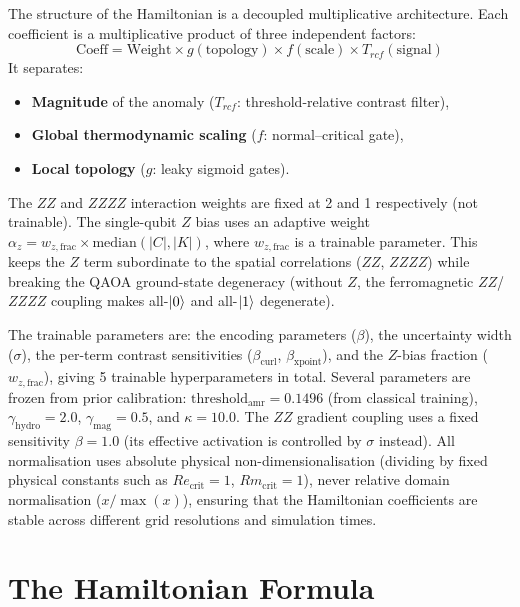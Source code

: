 \documentclass[12pt, a4paper, oneside]{report}
\begin{document}
The structure of the Hamiltonian is a decoupled multiplicative architecture. Each coefficient is a multiplicative product of three independent factors:
\begin{equation}
    \text{Coeff} = \text{Weight} \times g(\text{topology}) \times f(\text{scale}) \times T_{rcf}(\text{signal})
\end{equation}
It separates:
\begin{itemize}
    \item \textbf{Magnitude} of the anomaly ($T_{rcf}$: threshold-relative contrast filter),
    \item \textbf{Global thermodynamic scaling} ($f$: normal--critical gate),
    \item \textbf{Local topology} ($g$: leaky sigmoid gates).
\end{itemize}

The $ZZ$ and $ZZZZ$ interaction weights are fixed at 2 and 1 respectively (not trainable). The single-qubit $Z$ bias uses an adaptive weight $\alpha_z = w_{z,\text{frac}} \times \text{median}(|C|, |K|)$, where $w_{z,\text{frac}}$ is a trainable parameter. This keeps the $Z$ term subordinate to the spatial correlations ($ZZ$, $ZZZZ$) while breaking the QAOA ground-state degeneracy (without $Z$, the ferromagnetic $ZZ$/$ZZZZ$ coupling makes all-$\ket{0}$ and all-$\ket{1}$ degenerate).

The trainable parameters are: the encoding parameters ($\beta$), the uncertainty width ($\sigma$), the per-term contrast sensitivities ($\beta_{\text{curl}}$, $\beta_{\text{xpoint}}$), and the $Z$-bias fraction ($w_{z,\text{frac}}$), giving 5 trainable hyperparameters in total. Several parameters are frozen from prior calibration: $\text{threshold}_{\text{amr}} = 0.1496$ (from classical training), $\gamma_{\text{hydro}} = 2.0$, $\gamma_{\text{mag}} = 0.5$, and $\kappa = 10.0$. The $ZZ$ gradient coupling uses a fixed sensitivity $\beta = 1.0$ (its effective activation is controlled by $\sigma$ instead). All normalisation uses absolute physical non-dimensionalisation (dividing by fixed physical constants such as $Re_{\text{crit}} = 1$, $Rm_{\text{crit}} = 1$), never relative domain normalisation ($x / \max(x)$), ensuring that the Hamiltonian coefficients are stable across different grid resolutions and simulation times.

\section{The Hamiltonian Formula}
\end{document}
